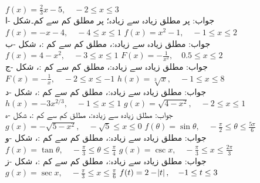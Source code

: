 $f(x)=\frac{2}{3}x-5,\quad -2\le x\le 3$\\
جواب:\quad
{} پر مطلق زیادہ سے زیادہ؛  پر  مطلق کم سے کم۔شکل -ا
$f(x)=-x-4,\quad -4\le x\le 1$
$f(x)=x^2-1,\quad -1\le x\le 2$\\
جواب:\quad
مطلق زیادہ سے زیادہ:، مطلق کم سے کم :، شکل -ب
$f(x)=4-x^2,\quad -3\le x\le 1$
$F(x)=-\tfrac{1}{x^2},\quad 0.5\le x\le 2$\\
جواب:\quad
مطلق زیادہ سے زیادہ:، مطلق کم سے کم :، شکل -ج
$F(x)=-\tfrac{1}{x},\quad -2\le x\le -1$
$h(x)=\sqrt[3]{x},\quad -1\le x\le 8$\\
جواب:\quad
مطلق زیادہ سے زیادہ:، مطلق کم سے کم :، شکل -د
$h(x)=-3x^{2/3},\quad -1\le x\le 1$
$g(x)=\sqrt{4-x^2},\quad -2\le x\le 1$\\
جواب:\quad
مطلق زیادہ سے زیادہ:، مطلق کم سے کم :، شکل -ہ
$g(x)=-\sqrt{5-x^2},\quad -\sqrt{5}\le x\le 0$
$f(\theta)=\sin\theta,\quad -\tfrac{\pi}{2}\le \theta \le \tfrac{5\pi}{6}$\\
جواب:\quad
مطلق زیادہ سے زیادہ:، مطلق کم سے کم :، شکل -و
$f(x)=\tan\theta,\quad -\tfrac{\pi}{3}\le \theta\le \tfrac{\pi}{4}$
$g(x)=\csc x,\quad -\tfrac{\pi}{3}\le x \le \tfrac{2\pi}{3}$\\
جواب:\quad
مطلق زیادہ سے زیادہ:، مطلق کم سے کم :، شکل -ز
$g(x)=\sec x,\quad -\tfrac{\pi}{3}\le x\le \tfrac{\pi}{6}$
$f(t)=2-\abs{t},\quad -1\le t\le 3$\\
